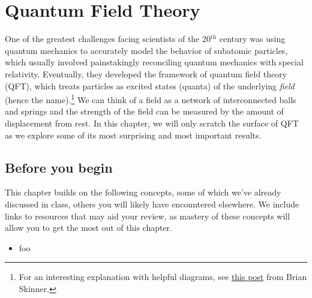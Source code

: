 

%

\chapter{Quantum Field Theory} \label{ch:qft}
One of the greatest challenges facing scientists of the 20$^{\text{th}}$ century was using quantum mechanics to accurately model the behavior of subatomic particles, which usually involved painstakingly reconciling quantum mechanics with special relativity. 
Eventually, they developed the framework of quantum field theory (QFT), which treats particles as excited states (quanta) of the underlying \emph{field} (hence the name).\footnote{For an interesting explanation with helpful diagrams, see \href{https://www.ribbonfarm.com/2015/08/20/qft/}{this post} from Brian Skinner.} 
We can think of a field as a network of interconnected balls and springs and the strength of the field can be measured by the amount of displacement from rest. 
In this chapter, we will only scratch the surface of QFT as we explore some of its most surprising and most important results. 


\section{Before you begin}

This chapter builds on the following concepts, some of which we've already discussed in class, others you will likely have encountered elsewhere.
We include links to resources that may aid your review, as mastery of these concepts will allow you to get the most out of this chapter.

\begin{itemize}
	\item foo
\end{itemize}

